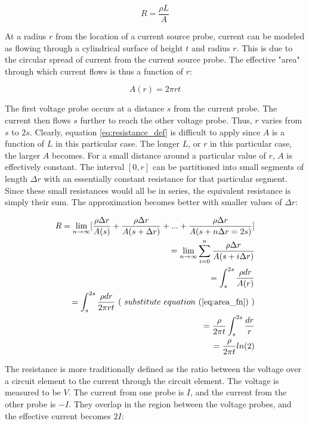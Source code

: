 \documentclass{article}
\begin{document}
\begin{equation}
\label{eq:resistance_def}
R = \frac{ \rho L }{ A }
\end{equation}

At a radius $r$ from the location of a current source probe, current can be modeled as flowing through a cylindrical surface of height $t$ and radius $r$. This is due to the circular spread of current from the current source probe. The effective "area" through which current flows is thus a function of $r$:

\begin{equation}
\label{eq:area_fn}
A(r) = 2 \pi r t
\end{equation}

The first voltage probe occurs at a distance $s$ from the current probe. The current then flows $s$ further to reach the other voltage probe. Thus, $r$ varies from $s$ to $2s$. Clearly, equation \ref{eq:resistance_def} is difficult to apply since $A$ is a function of $L$ in this particular case. The longer $L$, or $r$ in this particular case, the larger $A$ becomes.
For a small distance around a particular value of $r$, $A$ is effectively constant. The interval $[0,r]$ can be partitioned into small segments of length $\Delta r$ with an essentially constant resistance for that particular segment. Since these small resistances would all be in series, the equivalent resistance is simply their sum. The approximation becomes better with smaller values of $\Delta r$:

\begin{equation}
\label{eq:res_btwn_probes}
\begin{aligned}
R = \lim_{n\to\infty} [ \frac{ \rho \Delta r }{ A(s) } + \frac{ \rho \Delta r }{ A(s + \Delta r) } + ... + \frac{ \rho \Delta r }{ A(s + n \Delta r = 2s ) } ] \\
= \lim_{n\to\infty} \sum_{i=0}^{n} \frac{ \rho \Delta r }{ A( s + i\Delta r )} \\
= \int_{s}^{2s} \frac{ \rho dr }{ A(r) } \\
= \int_{s}^{2s} \frac{ \rho dr }{ 2 \pi r t } \ ( \ substitute \ equation \ (\ref{eq:area_fn}) \ ) \\
= \frac{ \rho }{ 2 \pi t } \int_{s}^{2s} \frac{ dr }{ r } \\
= \frac{ \rho }{ 2 \pi t } ln(2)
\end{aligned}
\end{equation}

The resistance is more traditionally defined as the ratio between the voltage over a circuit element to the current through the circuit element. The voltage is measured to be $V$. The current from one probe is $I$, and the current from the other probe is $-I$. They overlap in the region between the voltage probes, and the effective current becomes $2I$:
\end{document}

